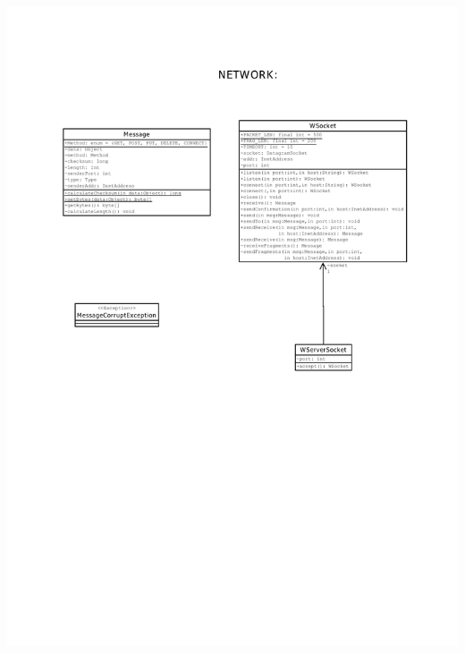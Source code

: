 \documentclass[11pt,english]{article}
\begin{document}
\includegraphics[width=6in]{figures/uml2.pdf}  \\
\newpage
\end{document}
